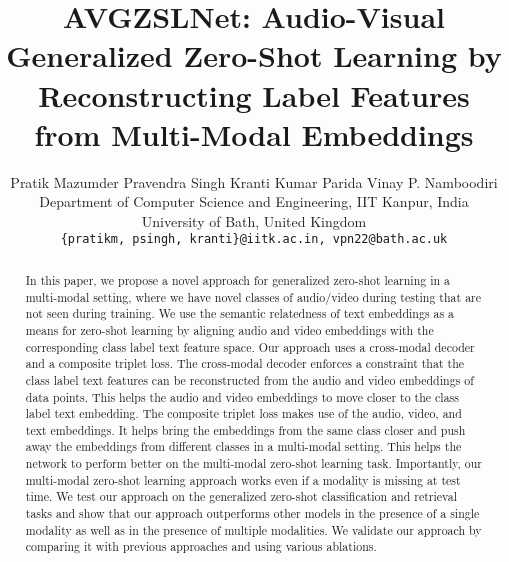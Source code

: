 \documentclass[10pt,twocolumn,letterpaper]{article}
\begin{document}
\title{AVGZSLNet: Audio-Visual Generalized Zero-Shot Learning by Reconstructing Label Features from Multi-Modal Embeddings}



\author{
Pratik Mazumder \hspace{1cm}Pravendra Singh \hspace{1cm}Kranti Kumar Parida \hspace{1cm}Vinay P. Namboodiri\\
Department of Computer Science and Engineering, IIT Kanpur, India\\
University of Bath, United Kingdom \\
{\tt\small \{pratikm, psingh, kranti\}@iitk.ac.in, vpn22@bath.ac.uk}
}

\maketitle


\begin{abstract}
In this paper, we propose a novel approach for generalized zero-shot learning in a multi-modal setting, where we have novel classes of audio/video during testing that are not seen during training. We use the semantic relatedness of text embeddings as a means for zero-shot learning by aligning audio and video embeddings with the corresponding class label text feature space. Our approach uses a cross-modal decoder and a composite triplet loss. The cross-modal decoder enforces a constraint that the class label text features can be reconstructed from the audio and video embeddings of data points. This helps the audio and video embeddings to move closer to the class label text embedding. The composite triplet loss makes use of the audio, video, and text embeddings. It helps bring the embeddings from the same class closer and push away the embeddings from different classes in a multi-modal setting. This helps the network to perform better on the multi-modal zero-shot learning task. Importantly, our multi-modal zero-shot learning approach works even if a modality is missing at test time.  We test our approach on the generalized zero-shot classification and retrieval tasks and show that our approach outperforms other models in the presence of a single modality as well as in the presence of multiple modalities. We validate our approach by comparing it with previous approaches and using various ablations.

\end{abstract}
\end{document}
